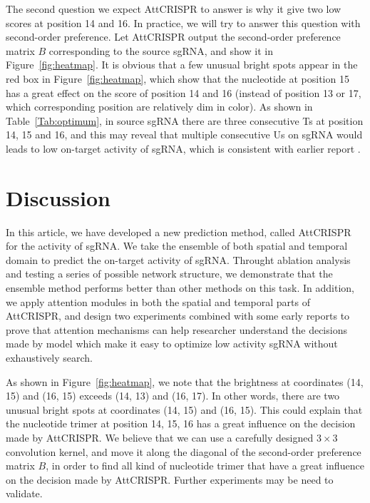 \documentclass{bioinfo}
\begin{document}
The second question we expect AttCRISPR to answer is why it give two low scores at position 14 and 16. 
In practice, we will try to answer this question with second-order preference. 
Let AttCRISPR output the second-order preference matrix $B$ corresponding to the source sgRNA, and show it in Figure~\ref{fig:heatmap}. 
It is obvious that a few unusual bright spots appear in the red box in Figure~\ref{fig:heatmap}, 
which show that the nucleotide at position 15 has a great effect on the score of position 14 and 16 (instead of position 13 or 17, which corresponding position are relatively dim in color). 
As shown in Table~\ref{Tab:optimum}, in source sgRNA there are three consecutive Ts at position 14, 15 and 16, and this may reveal that multiple consecutive Us on sgRNA would leads to low on-target activity of sgRNA, which is consistent with earlier report \citep{wu2014genome-wide}. 

\section{Discussion}

In this article, we have developed a new prediction method, called AttCRISPR for the activity of sgRNA. 
We take the ensemble of both spatial and temporal domain to predict the on-target activity of sgRNA. 
Throught ablation analysis and testing a series of possible network structure, we demonstrate that the ensemble method performs better than other methods on this task. 
In addition, we apply attention modules in both the spatial and temporal parts of AttCRISPR, 
and design two experiments combined with some early reports to prove that attention mechanisms can help researcher understand the decisions made by model which make it easy to optimize low activity sgRNA without exhaustively search. 

As shown in Figure~\ref{fig:heatmap}, we note that the brightness at coordinates (14, 15) and (16, 15) exceeds (14, 13) and (16, 17). 
In other words, there are two unusual bright spots at coordinates (14, 15) and (16, 15). 
This could explain that the nucleotide trimer at position 14, 15, 16 has a great influence on the decision made by AttCRISPR. 
We believe that we can use a carefully designed $3\times 3$ convolution kernel, and move it along the diagonal of the second-order preference matrix $B$, 
in order to find all kind of nucleotide trimer that have a great influence on the decision made by AttCRISPR. 
Further experiments may be need to validate. 
\end{document}
